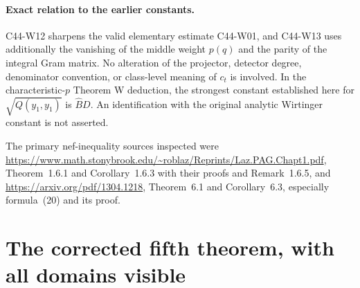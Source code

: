 \documentclass[11pt]{article}
\theoremstyle{remark}\newtheorem{remark}[theorem]{Remark}
\begin{document}
\paragraph{Exact relation to the earlier constants.}
C44-W12 sharpens the valid elementary estimate C44-W01, and
C44-W13 uses additionally the vanishing of the middle weight
$p(q)$ and the parity of the integral Gram matrix. No alteration
of the projector, detector degree, denominator convention, or
class-level meaning of $c_t$ is involved. In the characteristic-$p$
Theorem W deduction, the strongest constant established here for
$\sqrt{Q(y_1,y_1)}$ is $\widehat B D$. An identification with the
original analytic Wirtinger constant is not asserted.

The primary nef-inequality sources inspected were
\url{https://www.math.stonybrook.edu/~roblaz/Reprints/Laz.PAG.Chapt1.pdf},
Theorem~1.6.1 and Corollary~1.6.3 with their proofs and
Remark~1.6.5, and
\url{https://arxiv.org/pdf/1304.1218}, Theorem~6.1 and
Corollary~6.3, especially formula~(20) and its proof.



\section{The corrected fifth theorem, with all domains visible}
\end{document}
